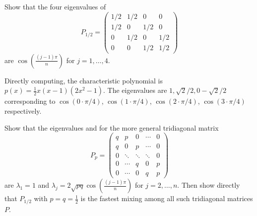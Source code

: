 \documentclass[12pt]{article}
\begin{document}
\begin{exercise}
    Show that the four eigenvalues of
    \[
        P_{1/2} =
        \begin{pmatrix}
            1/2 & 1/2 & 0 & 0 \\
            1/2 & 0 & 1/2 & 0 \\
            0 & 1/2 & 0 & 1/2 \\
            0 & 0 & 1/2 & 1/2
        \end{pmatrix}
    \] are \( \cos\left( \frac{(j-1) \pi}{n} \right) \) for \( j=1,
    \dots, 4 \).
\end{exercise}
\begin{solution}
    Directly computing, the characteristic polynomial is \( p(x) = \frac
    {1}{2} x(x-1)(2x^2 - 1) \).  The eigenvalues are \( 1, \sqrt{2}/2, 0
    -\sqrt{2}/2 \) corresponding to \( \cos(0 \cdot \pi/4) \), \( \cos(1
    \cdot \pi/4) \), \( \cos(2 \cdot \pi/4) \), \( \cos(3 \cdot \pi/4) \)
    respectively.
\end{solution}

\begin{exercise}
    Show that the eigenvalues and for the more general tridiagonal
    matrix
    \[
        P_p =
        \begin{pmatrix}
            q & p & 0 & \cdots & 0 \\
            q & 0 & p & \cdots & 0 \\
            0 & \ddots & \ddots & \ddots& 0 \\
            0 & \cdots & q & 0 & p \\
            0 & \cdots & 0 & q & p
        \end{pmatrix}
    \] are \( \lambda_1 = 1 \) and \( \lambda_j = 2 \sqrt{pq} \cos\left(
    \frac{(j-1) \pi}{n} \right) \) for \( j=2, \dots, n \).  Then show
    directly that \( P_{1/2} \) with \( p = q = \frac{1}{2} \) is the
    fastest mixing among all such tridiagonal matrices \( P \).
\end{exercise}
\end{document}
